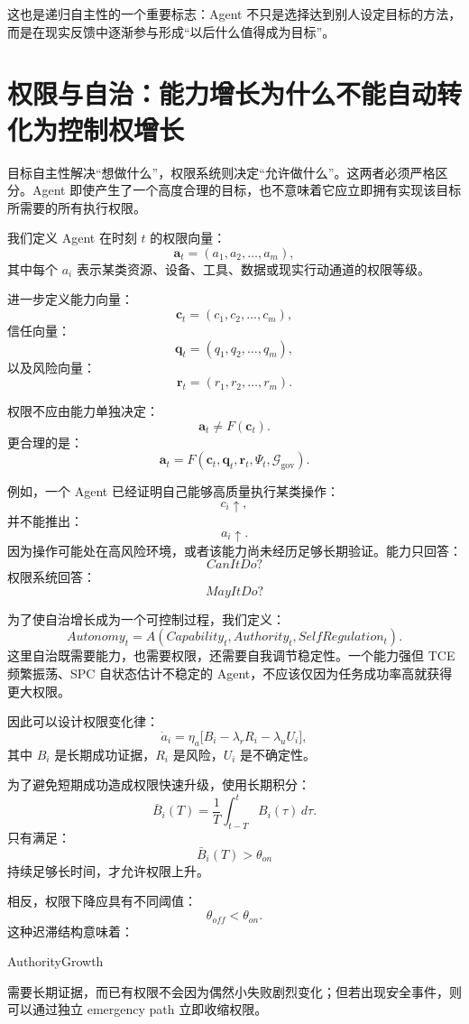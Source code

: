 这也是递归自主性的一个重要标志：Agent 不只是选择达到别人设定目标的方法，而是在现实反馈中逐渐参与形成“以后什么值得成为目标”。

\section{权限与自治：能力增长为什么不能自动转化为控制权增长}

目标自主性解决“想做什么”，权限系统则决定“允许做什么”。这两者必须严格区分。Agent 即使产生了一个高度合理的目标，也不意味着它应立即拥有实现该目标所需要的所有执行权限。

我们定义 Agent 在时刻 $t$ 的权限向量：
\[
\mathbf a_t
=
(a_1,a_2,\ldots,a_m),
\]
其中每个 $a_i$ 表示某类资源、设备、工具、数据或现实行动通道的权限等级。

进一步定义能力向量：
\[
\mathbf c_t
=
(c_1,c_2,\ldots,c_m),
\]
信任向量：
\[
\mathbf q_t
=
(q_1,q_2,\ldots,q_m),
\]
以及风险向量：
\[
\mathbf r_t
=
(r_1,r_2,\ldots,r_m).
\]

权限不应由能力单独决定：
\[
\mathbf a_t
\neq
F(\mathbf c_t).
\]
更合理的是：
\[
\boxed{
\mathbf a_t
=
F(
\mathbf c_t,
\mathbf q_t,
\mathbf r_t,
\Psi_t,
\mathcal G_{\mathrm{gov}}
).
}
\]

例如，一个 Agent 已经证明自己能够高质量执行某类操作：
\[
c_i\uparrow,
\]
并不能推出：
\[
a_i\uparrow.
\]
因为操作可能处在高风险环境，或者该能力尚未经历足够长期验证。能力只回答：
\[
CanItDo?
\]
权限系统回答：
\[
MayItDo?
\]

为了使自治增长成为一个可控制过程，我们定义：
\[
Autonomy_t
=
A(
Capability_t,
Authority_t,
SelfRegulation_t
).
\]
这里自治既需要能力，也需要权限，还需要自我调节稳定性。一个能力强但 TCE 频繁振荡、SPC 自状态估计不稳定的 Agent，不应该仅因为任务成功率高就获得更大权限。

因此可以设计权限变化律：
\[
\dot a_i
=
\eta_a
\Big[
B_i
-
\lambda_r R_i
-
\lambda_u U_i
\Big],
\]
其中 $B_i$ 是长期成功证据，$R_i$ 是风险，$U_i$ 是不确定性。

为了避免短期成功造成权限快速升级，使用长期积分：
\[
\bar B_i(T)
=
\frac{1}{T}
\int_{t-T}^{t}
B_i(\tau)\,d\tau.
\]
只有满足：
\[
\bar B_i(T)>\theta_{on}
\]
持续足够长时间，才允许权限上升。

相反，权限下降应具有不同阈值：
\[
\theta_{off}<\theta_{on}.
\]
这种迟滞结构意味着：
\begin{statementbox}
AuthorityGrowth
\end{statementbox}
需要长期证据，而已有权限不会因为偶然小失败剧烈变化；但若出现安全事件，则可以通过独立 emergency path 立即收缩权限。

